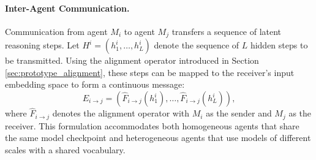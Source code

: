 \documentclass[11pt]{article}
\begin{document}
\paragraph{Inter-Agent Communication.}
Communication from agent $M_i$ to agent $M_j$ transfers a sequence of latent reasoning steps. Let $H^i=(h_1^i,\ldots,h_L^i)$ denote the sequence of $L$ hidden steps to be transmitted. Using the alignment operator introduced in Section \ref{sec:prototype_alignment}, these steps can be mapped to the receiver's input embedding space to form a continuous message:
\begin{equation}
    E_{i\rightarrow j}
    =
    \left(
        \widehat{F}_{i\rightarrow j}(h_1^i),
        \ldots,
        \widehat{F}_{i\rightarrow j}(h_L^i)
    \right),
    \label{eq:inter_agent_message}
\end{equation}
where $\widehat{F}_{i\rightarrow j}$ denotes the alignment operator with $M_i$ as the sender and $M_j$ as the receiver. This formulation accommodates both homogeneous agents that share the same model checkpoint and heterogeneous agents that use models of different scales with a shared vocabulary.

\end{document}
